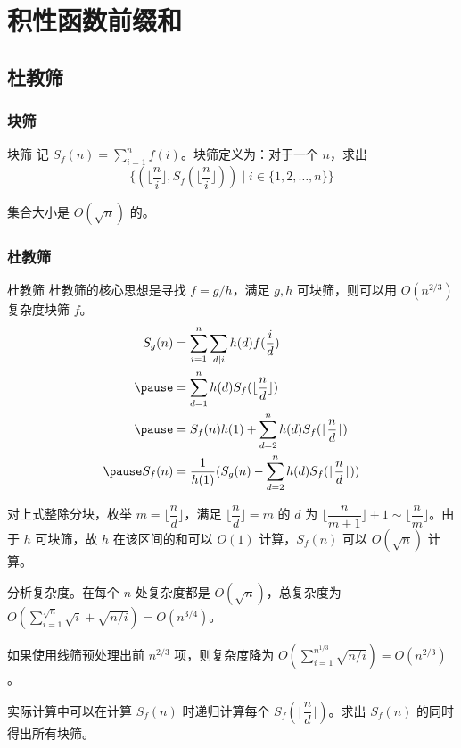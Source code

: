\documentclass[../main.tex]{subfiles}
\begin{document}
\section{积性函数前缀和}

\subsection{杜教筛}

\subsubsection{块筛}

\begin{frame}{块筛}
记 $S_f(n)=\sum\limits_{i=1}^nf(i)$。块筛定义为：对于一个 $n$，求出
$$
\{(\lfloor\frac{n}{i}\rfloor,S_f(\lfloor\frac{n}{i}\rfloor))\mid i\in\{1,2,\dots,n\} \}
$$\pause

集合大小是 $O(\sqrt n)$ 的。
\end{frame}

\subsubsection{杜教筛}

\begin{frame}{杜教筛}
杜教筛的核心思想是寻找 $f=g/h$，满足 $g,h$ 可块筛，则可以用 $O(n^{2/3})$ 复杂度块筛 $f$。\pause
$$
\begin{aligned}
S_g(n)&=\sum_{i=1}^n\sum_{d\mid i}h(d)f(\frac{i}{d})\\ \pause
&=\sum_{d=1}^nh(d)S_f(\lfloor\frac{n}{d}\rfloor)\\ \pause
&=S_f(n)h(1)+\sum_{d=2}^nh(d)S_f(\lfloor\frac{n}{d}\rfloor)\\ \pause
S_f(n)&=\frac{1}{h(1)}(S_g(n)-\sum_{d=2}^nh(d)S_f(\lfloor\frac{n}{d} \rfloor))
\end{aligned}
$$
\end{frame}

\begin{frame}
对上式整除分块，枚举 $m=\lfloor\dfrac{n}{d}\rfloor$，满足 $\lfloor\dfrac{n}{d}\rfloor=m$ 的 $d$ 为 $\lfloor\dfrac{n}{m+1}\rfloor+1\sim\lfloor\dfrac{n}{m}\rfloor$。由于 $h$ 可块筛，故 $h$ 在该区间的和可以 $O(1)$ 计算，$S_f(n)$ 可以 $O(\sqrt n)$ 计算。\pause

分析复杂度。在每个 $n$ 处复杂度都是 $O(\sqrt n)$，总复杂度为 $O(\sum\limits_{i=1}^{\sqrt n}\sqrt i+\sqrt{n/i})=O(n^{3/4})$。\pause

如果使用线筛预处理出前 $n^{2/3}$ 项，则复杂度降为 $O(\sum\limits_{i=1}^{n^{1/3}}\sqrt{n/i})=O(n^{2/3})$。\pause

实际计算中可以在计算 $S_f(n)$ 时递归计算每个 $S_f(\lfloor\dfrac{n}{d}\rfloor)$。求出 $S_f(n)$ 的同时得出所有块筛。
\end{frame}
\end{document}
